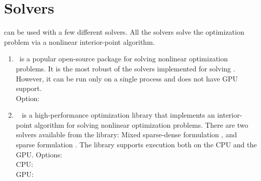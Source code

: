 \section{Solvers}\label{sec:opflow_solvers}
\opflow can be used with a few different solvers. All the solvers solve the optimization problem via a nonlinear interior-point algorithm.
\begin{enumerate}
  \item \ipopt~is a popular open-source package for solving nonlinear optimization problems. It is the most robust of the solvers implemented for solving \opflow. However, it can be run only on a single process and does not have GPU support. \\ Option:
   

  \item \hiop~ is a high-performance optimization library that implements an interior-point algorithm for solving nonlinear optimization problems. There are two solvers available from the \hiop library: Mixed sparse-dense formulation {}, and sparse formulation {}. The library supports execution both on the CPU and the GPU. Options: \\ CPU: {} {} {} \\ GPU:  {} {} 


\end{enumerate}

